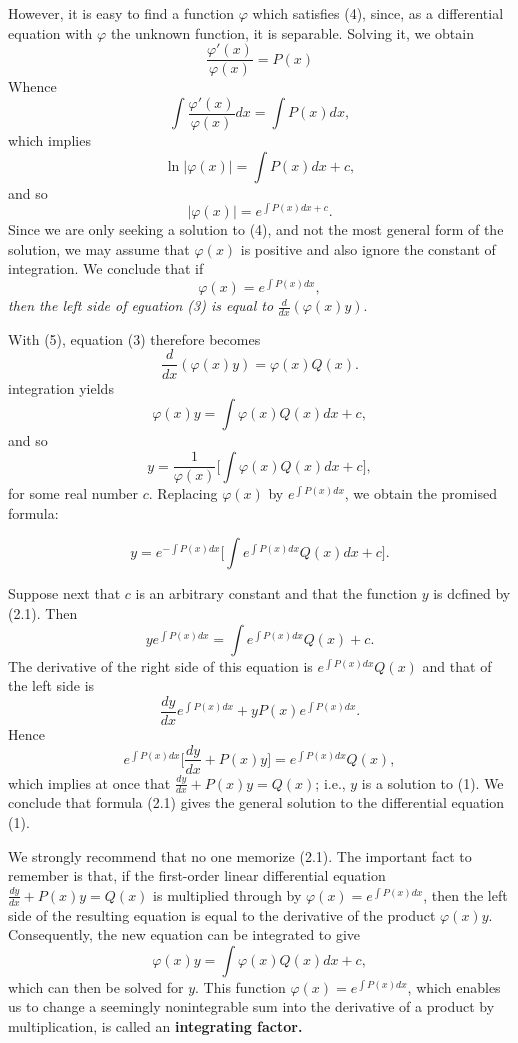 However, it is easy to find a function $\varphi$ which satisfies (4), since, as a differential equation with $\varphi$ the unknown function, it is separable. Solving it, we obtain
$$
\frac{\varphi'(x)}{\varphi(x)} = P(x)
$$
Whence 
$$
\int \frac{\varphi'(x)}{\varphi(x)} dx = \int P(x) dx ,
$$
which implies 
$$
\ln |\varphi(x)| = \int P(x) dx + c, 
$$
and so 
$$
|\varphi(x)| = e^{\int P(x)dx+c} .
$$
Since we are only seeking a solution to (4), and not the most general form of the solution, we may assume that $\varphi(x)$ is positive and also ignore the constant of integration. We conclude that if
\begin{equation}
\varphi(x) = e^{\int P(x) dx},
\label{eq11.2.5}
\end{equation}
\textit{then the left side of eguation (3) is equal to} $\frac{d}{dx} (\varphi(x)y)$.

With (5), equation (3) therefore becomes
$$
\frac{d}{dx} (\varphi(x)y) = \varphi(x)Q(x). 
$$
integration yields 
$$
\varphi(x)y = \int \varphi(x) Q(x) dx + c,
$$
and so 
$$
y = \frac{1}{\varphi(x)} \Big[ \int \varphi(x) Q(x) dx + c \Big] ,
$$
for some real number $c$. Replacing $\varphi(x)$ by $e^{\int P(x)dx}$, we obtain the promised formula:
\begin{theorem}
$$
y = e^{- \int P(x)dx} \Big[\int e^{\int P(x)dx} Q(x) dx + c \Big]  .
$$
\end{theorem}

Suppose next that $c$ is an arbitrary constant and that the function $y$ is
dcfined by (2.1). Then
$$
ye^{\int P(x)dx} = \int e^{\int P(x)dx} Q(x) + c.
$$
The derivative of the right side of this equation is $e^{\int P(x)dx}Q(x)$ and that of the left side is
$$
\frac{dy}{dx} e^{\int P(x)dx} + yP(x)e^{\int P(x)dx} .
$$
Hence
$$
e^{\int P(x)dx} \Big[\frac{dy}{dx} + P(x)y \Big] = e^{\int P(x)dx} Q(x), 
$$
which implies at once that $\frac{dy}{dx} + P(x)y = Q(x)$; i.e., $y$ is a solution to (1). We conclude that formula (2.1) gives the general solution to the differential equation (1).

We strongly recommend that no one memorize (2.1). The important fact to remember is that, if the first-order linear differential equation $\frac{dy}{dx} + P(x)y = Q(x)$ is multiplied through by $\varphi(x) = e^{\int P(x)dx}$, then the left side of the resulting equation is equal to the derivative of the product $\varphi(x)y$. Consequently, the new equation can be integrated to give
$$
\varphi(x)y = \int \varphi(x) Q(x) dx + c,
$$
which can then be solved for $y$. This function $\varphi(x) = e^{\int P(x)dx}$, which enables us to change a seemingly nonintegrable sum into the derivative of a product by multiplication, is called an \textbf{integrating factor.}


